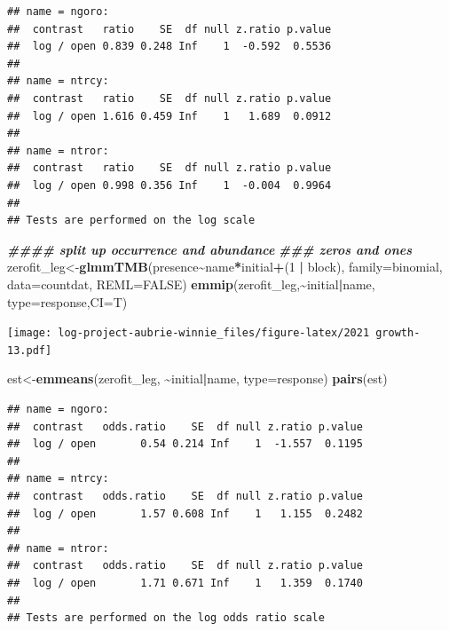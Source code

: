 \documentclass[
]{article}
\newenvironment{Shaded}{\begin{snugshade}}{\end{snugshade}}
\newcommand{\AttributeTok}[1]{\textcolor[rgb]{0.13,0.29,0.53}{#1}}
\newcommand{\ConstantTok}[1]{\textcolor[rgb]{0.56,0.35,0.01}{#1}}
\newcommand{\DecValTok}[1]{\textcolor[rgb]{0.00,0.00,0.81}{#1}}
\newcommand{\DocumentationTok}[1]{\textcolor[rgb]{0.56,0.35,0.01}{\textbf{\textit{#1}}}}
\newcommand{\FunctionTok}[1]{\textcolor[rgb]{0.13,0.29,0.53}{\textbf{#1}}}
\newcommand{\NormalTok}[1]{#1}
\newcommand{\OtherTok}[1]{\textcolor[rgb]{0.56,0.35,0.01}{#1}}
\newcommand{\SpecialCharTok}[1]{\textcolor[rgb]{0.81,0.36,0.00}{\textbf{#1}}}
\newcommand{\StringTok}[1]{\textcolor[rgb]{0.31,0.60,0.02}{#1}}
\begin{document}
\begin{verbatim}
## name = ngoro:
##  contrast   ratio    SE  df null z.ratio p.value
##  log / open 0.839 0.248 Inf    1  -0.592  0.5536
## 
## name = ntrcy:
##  contrast   ratio    SE  df null z.ratio p.value
##  log / open 1.616 0.459 Inf    1   1.689  0.0912
## 
## name = ntror:
##  contrast   ratio    SE  df null z.ratio p.value
##  log / open 0.998 0.356 Inf    1  -0.004  0.9964
## 
## Tests are performed on the log scale
\end{verbatim}

\begin{Shaded}
\begin{Highlighting}[]
\DocumentationTok{\#\#\#\# split up occurrence and abundance}
\DocumentationTok{\#\#\# zeros and ones }
\NormalTok{zerofit\_leg}\OtherTok{\textless{}{-}}\FunctionTok{glmmTMB}\NormalTok{(presence}\SpecialCharTok{\textasciitilde{}}\NormalTok{name}\SpecialCharTok{*}\NormalTok{initial}\SpecialCharTok{+}\NormalTok{(}\DecValTok{1} \SpecialCharTok{|}\NormalTok{ block), }\AttributeTok{family=}\NormalTok{binomial, }\AttributeTok{data=}\NormalTok{countdat, }\AttributeTok{REML=}\ConstantTok{FALSE}\NormalTok{)}
\FunctionTok{emmip}\NormalTok{(zerofit\_leg,}\SpecialCharTok{\textasciitilde{}}\NormalTok{initial}\SpecialCharTok{|}\NormalTok{name, }\AttributeTok{type=}\StringTok{\textquotesingle{}response\textquotesingle{}}\NormalTok{,}\AttributeTok{CI=}\NormalTok{T)}
\end{Highlighting}
\end{Shaded}

\texttt{[image: log-project-aubrie-winnie\_files/figure-latex/2021 growth-13.pdf]}

\begin{Shaded}
\begin{Highlighting}[]
\NormalTok{est}\OtherTok{\textless{}{-}}\FunctionTok{emmeans}\NormalTok{(zerofit\_leg, }\SpecialCharTok{\textasciitilde{}}\NormalTok{initial}\SpecialCharTok{|}\NormalTok{name, }\AttributeTok{type=}\StringTok{\textquotesingle{}response\textquotesingle{}}\NormalTok{)}
\FunctionTok{pairs}\NormalTok{(est)}
\end{Highlighting}
\end{Shaded}

\begin{verbatim}
## name = ngoro:
##  contrast   odds.ratio    SE  df null z.ratio p.value
##  log / open       0.54 0.214 Inf    1  -1.557  0.1195
## 
## name = ntrcy:
##  contrast   odds.ratio    SE  df null z.ratio p.value
##  log / open       1.57 0.608 Inf    1   1.155  0.2482
## 
## name = ntror:
##  contrast   odds.ratio    SE  df null z.ratio p.value
##  log / open       1.71 0.671 Inf    1   1.359  0.1740
## 
## Tests are performed on the log odds ratio scale
\end{verbatim}
\end{document}
